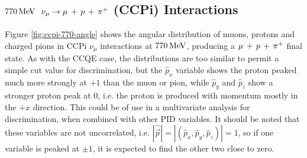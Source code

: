 \subsection{$770\,\mathrm{MeV}$ $\nu_\mu \rightarrow \mu\,+\,p\,+\,\pi^{+}$ (\acs{CCPi}) Interactions}
Figure \ref{fig:ccpi-770-angle} shows the angular distribution of muons, protons and charged pions in \acs{CCPi} $\nu_\mu$ interactions at $770\,\mathrm{MeV}$, producing a $\mu\,+\,p\,+\,\pi^{+}$ final state. As with the \acs{CCQE} case, the distributions are too similar to permit a simple cut value for discrimination, but the $\hat{p}_x$ variable shows the proton peaked much more strongly at $+1$ than the muon or pion, while $\hat{p}_y$ and $\hat{p}_z$ show a stronger proton peak at $0$, i.e. the proton is produced with momentum mostly in the $+x$ direction. This could be of use in a multivariate analysis for discrimination, when combined with other PID variables. It should be noted that these variables are not uncorrelated, i.e. $\left|\hat{\vec{p}}\right| = \left|(\hat{p}_x, \hat{p}_y, \hat{p}_z)\right| = 1$, so if one variable is peaked at $\pm 1$, it is expected to find the other two close to zero.

